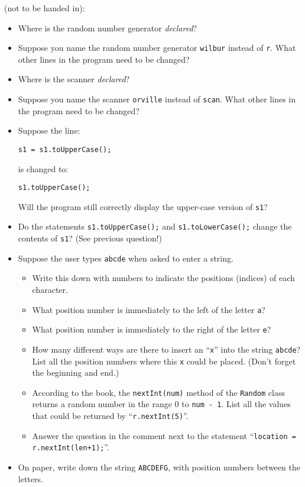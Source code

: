 (not to be handed in):
\begin{itemize}
\item Where is the random number generator {\em declared}?
\item Suppose you name the random number generator {\tt wilbur} instead of {\tt r}.
What other lines in the program need to be changed?
\item Where is the scanner {\em declared}?
\item Suppose you name the scanner {\tt orville} instead of {\tt scan}.
What other lines in the program need to be changed?
\item
Suppose the line:
\begin{center}
\verb$s1 = s1.toUpperCase();$
\end{center}
is changed to:
\begin{center}
\verb$s1.toUpperCase();$
\end{center}
Will the program still correctly display the upper-case version of {\tt s1}?
\item
Do the statements {\tt s1.toUpperCase();} and {\tt s1.toLowerCase();} 
change the contents of {\tt s1}? (See previous question!)
\item
Suppose the user types {\tt abcde} when asked to enter a string.
\begin{itemize}
\item Write this down with numbers to indicate the positions (indices) of each character.
\item
What position number is immediately to the left of the letter {\tt a}?
\item
What position number is immediately to the right of the letter {\tt e}?
\item
How many different ways are there to insert an ``{\tt x}'' into the string
{\tt abcde}? List all the position numbers where this {\tt x} could be placed.
(Don't forget the beginning and end.)
\item
According to the book, the {\tt nextInt(num)} method of the {\tt Random}
class returns a random number in the range 0 to {\tt num - 1}.
List all the values that could be returned by ``{\tt r.nextInt(5)}''.
\item
Answer the question in the comment next to the statement ``\verb$location = r.nextInt(len+1);$''.
\end{itemize}
\item
On paper, write down the string {\tt ABCDEFG}, with position numbers 
between the letters. 

\end{itemize}
